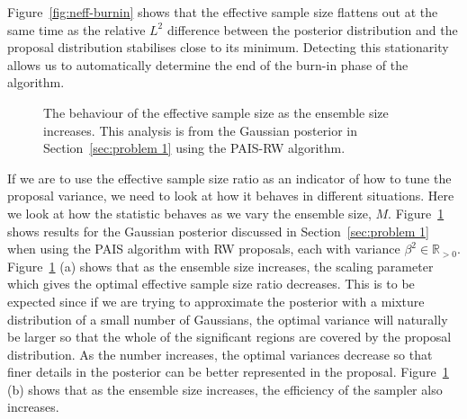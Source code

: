 \documentclass[final]{siamltex}
\begin{document}
Figure~\ref{fig:neff-burnin} shows that the effective sample size flattens
out at the same time as the relative $L^2$ difference between
the posterior distribution and the proposal distribution stabilises close to
its minimum. Detecting this stationarity allows us to automatically
determine the end of the burn-in phase of the algorithm.

\begin{figure}[htb]
\centering
{}
\caption{The behaviour of the effective sample size as the ensemble size increases. This analysis is from the Gaussian posterior in Section~\ref{sec:problem 1} using the PAIS-RW algorithm.}
\label{fig:neff-M}
\end{figure}

If we are to use the effective sample size ratio as an indicator of
how to tune the proposal variance, we need to look at how it behaves
in different situations. Here we look at how the statistic behaves as
we vary the ensemble size, $M$. Figure~\ref{fig:neff-M} shows results
for the Gaussian posterior discussed in Section~\ref{sec:problem 1}
when using the PAIS algorithm with RW proposals, each with variance
$\beta^2 \in \mathbb{R}_{>0}$. Figure~\ref{fig:neff-M} (a) shows that
as the ensemble size increases, the scaling parameter which gives the
optimal effective sample size ratio decreases. This is to be expected
since if we are trying to approximate the posterior with a mixture
distribution of a small number of Gaussians, the optimal variance will
naturally be larger so that the whole of the significant regions are
covered by the proposal distribution. As the number increases, the
optimal variances decrease so that finer details in the posterior can
be better represented in the proposal. Figure~\ref{fig:neff-M} (b) shows that as the ensemble size increases, the efficiency of the sampler also increases.
\end{document}
